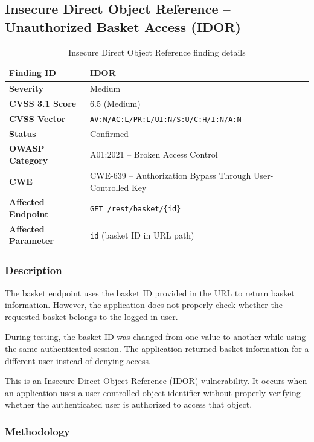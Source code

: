 \subsection*{Insecure Direct Object Reference -- Unauthorized Basket Access (IDOR)}

\begin{table}[H]
\centering
\begin{tabular}{|l|p{10cm}|}
\hline
\textbf{Finding ID} & IDOR \\
\hline
\textbf{Severity} & Medium \\
\hline
\textbf{CVSS 3.1 Score} & 6.5 (Medium) \\
\hline
\textbf{CVSS Vector} & \texttt{AV:N/AC:L/PR:L/UI:N/S:U/C:H/I:N/A:N} \\
\hline
\textbf{Status} & Confirmed \\
\hline
\textbf{OWASP Category} & A01:2021 -- Broken Access Control \\
\hline
\textbf{CWE} & CWE-639 -- Authorization Bypass Through User-Controlled Key \\
\hline
\textbf{Affected Endpoint} & \verb|GET /rest/basket/{id}| \\
\hline
\textbf{Affected Parameter} & \texttt{id} (basket ID in URL path) \\
\hline
\end{tabular}
\caption{Insecure Direct Object Reference finding details}
\end{table}

\subsubsection*{Description}

The basket endpoint uses the basket ID provided in the URL to return
basket information. However, the application does not properly check
whether the requested basket belongs to the logged-in user.

During testing, the basket ID was changed from one value to another
while using the same authenticated session. The application returned
basket information for a different user instead of denying access.

This is an Insecure Direct Object Reference (IDOR) vulnerability. It
occurs when an application uses a user-controlled object identifier
without properly verifying whether the authenticated user is
authorized to access that object.

\subsubsection*{Methodology}

